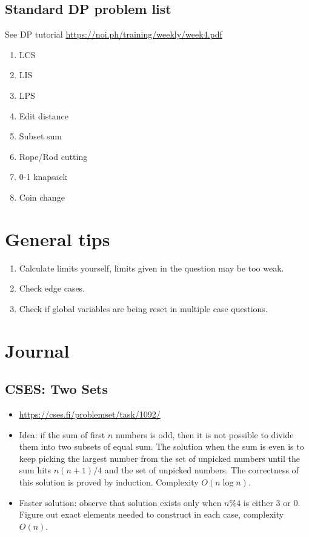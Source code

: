 \documentclass[titlepage, 12pt]{book}
\begin{document}
\section{Standard DP problem list}
See DP tutorial \url{https://noi.ph/training/weekly/week4.pdf}
\begin{enumerate}
  \item LCS
  \item LIS
  \item LPS
  \item Edit distance
  \item Subset sum
  \item Rope/Rod cutting
  \item 0-1 knapsack
  \item Coin change
\end{enumerate}

\chapter{General tips}
\begin{enumerate}
  \item Calculate limits yourself, limits given in the question may be too weak.
  \item Check edge cases.
  \item Check if global variables are being reset in multiple case questions.
\end{enumerate}

\chapter{Journal}

\section{CSES: Two Sets}

\begin{itemize}
    \item \url{https://cses.fi/problemset/task/1092/}
    \item Idea: if the sum of first $n$ numbers is odd, then it is not possible to
        divide them into two subsets of equal sum. The solution when the sum is even is
        to keep picking the largest number from the set of unpicked numbers until the
        sum hits $n(n+1)/4$ and the set of unpicked numbers. The correctness of this
        solution is proved by induction. Complexity $O(n\log n)$.
    \item Faster solution: observe that solution exists only when $n\%4$ is
        either 3 or 0. Figure out exact elements needed to construct in each
        case, complexity $O(n)$.
\end{itemize}
\end{document}
